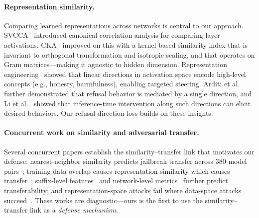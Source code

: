 \paragraph{Representation similarity.}
Comparing learned representations across networks is central to our approach. SVCCA~\citep{raghu2017svcca} introduced canonical correlation analysis for comparing layer activations. CKA~\citep{kornblith2019similarity} improved on this with a kernel-based similarity index that is invariant to orthogonal transformation and isotropic scaling, and that operates on Gram matrices---making it agnostic to hidden dimension. Representation engineering~\citep{repeng} showed that linear directions in activation space encode high-level concepts (e.g., honesty, harmfulness), enabling targeted steering. Arditi et al.~\citep{arditi2024refusal} further demonstrated that refusal behavior is mediated by a single direction, and Li et al.~\citep{li2023iti} showed that inference-time intervention along such directions can elicit desired behaviors. Our refusal-direction loss builds on these insights.

\paragraph{Concurrent work on similarity and adversarial transfer.}
Several concurrent papers establish the similarity--transfer link that motivates our defense: nearest-neighbor similarity predicts jailbreak transfer across 380 model pairs~\citep{angell2025transfer}; training data overlap causes representation similarity which causes transfer~\citep{li2025causes}; suffix-level features~\citep{ball2025suffixes} and network-level metrics~\citep{klause2025network} further predict transferability; and representation-space attacks fail where data-space attacks succeed~\citep{gupta2025repspace}. These works are diagnostic---ours is the first to use the similarity--transfer link as a \emph{defense mechanism}.

